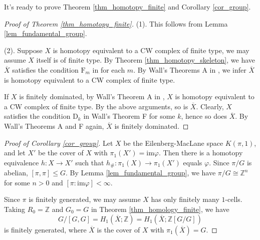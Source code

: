 \documentclass[12pt]{amsart}
\theoremstyle{plain}
\theoremstyle{definition}
\theoremstyle{question}
\theoremstyle{remark}
\theoremstyle{assumption}
\numberwithin{equation}{section}
\theoremstyle{bigthm}
\begin{document}
It's ready to prove Theorem \ref{thm_homotopy_finite} and Corollary \ref{cor_group}.
\begin{proof}[Proof of Theorem \ref{thm_homotopy_finite}]
(1). This follows from Lemma \ref{lem_fundamental_group}.

(2). Suppose $X$ is homotopy equivalent to a CW complex of finite type, we may assume $X$ itself is of finite type. By Theorem \ref{thm_homotopy_skeleton}, we have $\overline{X}$ satisfies the condition $\mathrm{F}_{m}$ in \cite{Wall65} for each $m$. By Wall's Theorems A in \cite{Wall65}, we infer $\overline{X}$ is homotopy equivalent to a CW complex of finite type.

If $X$ is finitely dominated, by Wall's Theorem A in \cite{Wall65}, $X$ is homotopy equivalent to a CW complex of finite type. By the above arguments, so is $\overline{X}$. Clearly, $X$ satisfies the condition $\mathrm{D}_{k}$ in Wall's Theorem F for some $k$, hence so does $\overline{X}$. By Wall's Theorems A and F again, $\overline{X}$ is finitely dominated.
\end{proof}

\begin{proof}[Proof of Corollary \ref{cor_group}]
Let $X$ be the Eilenberg-MacLane space $K(\pi, 1)$, and let $X'$ be the cover of $X$ with $\pi_{1} (X') = \mathrm{im} \varphi$. Then there is a homotopy equivalence $h \colon  X \rightarrow X'$ such that $h_{\#} \colon  \pi_{1} (X) \rightarrow \pi_{1} (X')$ equals $\varphi$. Since $\pi /G$ is abelian, $[\pi, \pi] \le G$. By Lemma \ref{lem_fundamental_group}, we have $\pi / G\cong \mathbb{Z}^{n}$ for some $n>0$ and $[\pi : \mathrm{im} \varphi] < \infty$.

Since $\pi$ is finitely generated, we may assume $X$ has only finitely many $1$-cells. Taking $R_{0} = \mathbb{Z}$ and $G_{0} = G$ in Theorem \ref{thm_homology_finite}, we have
\[
G/[G,G] = H_{1} (\overline{X}; \mathbb{Z}) = H_{1} (\overline{X}; \mathbb{Z} [G/G])
\]
is finitely generated, where $\overline{X}$ is the cover of $X$ with $\pi_{1} (\overline{X}) = G$.
\end{proof}

\end{document}
